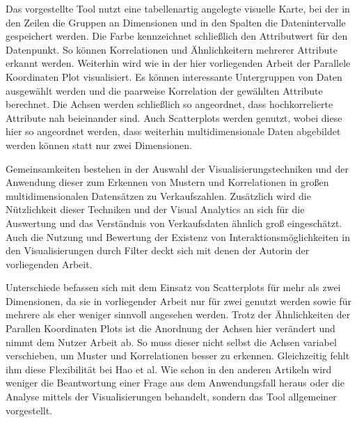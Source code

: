 \documentclass[usegeometry=true]{scrartcl}
\begin{document}
Das vorgestellte Tool nutzt eine tabellenartig angelegte visuelle Karte, bei der in den Zeilen die Gruppen an Dimensionen und in den Spalten die Datenintervalle gespeichert werden.
Die Farbe kennzeichnet schließlich den Attributwert für den Datenpunkt. So können Korrelationen und Ähnlichkeitern mehrerer Attribute erkannt werden.
Weiterhin wird wie in der hier vorliegenden Arbeit der Parallele Koordinaten Plot visualisiert. 
Es können interessante Untergruppen von Daten ausgewählt werden und die paarweise Korrelation der gewählten Attribute berechnet. 
Die Achsen werden schließlich so angeordnet, dass hochkorrelierte Attribute nah beieinander sind. 
Auch Scatterplots werden genutzt, wobei diese hier so angeordnet werden, dass weiterhin multidimensionale Daten abgebildet werden können statt nur zwei Dimensionen.

Gemeinsamkeiten bestehen in der Auswahl der Visualisierungstechniken und der Anwendung dieser zum Erkennen von Mustern und Korrelationen in großen multidimensionalen Datensätzen zu Verkaufszahlen.
Zusätzlich wird die Nützlichkeit dieser Techniken und der Visual Analytics an sich für die Auswertung und das Verständnis von Verkaufsdaten ähnlich groß eingeschätzt.
Auch die Nutzung und Bewertung der Existenz von Interaktionsmöglichkeiten in den Visualisierungen durch Filter deckt sich mit denen der Autorin der vorliegenden Arbeit.

Unterschiede befassen sich mit dem Einsatz von Scatterplots für mehr als zwei Dimensionen, da sie in vorliegender Arbeit nur für zwei genutzt werden sowie für mehrere als eher weniger sinnvoll angesehen werden.
Trotz der Ähnlichkeiten der Parallen Koordinaten Plots ist die Anordnung der Achsen hier verändert und nimmt dem Nutzer Arbeit ab. 
So muss dieser nicht selbst die Achsen variabel verschieben, um Muster und Korrelationen besser zu erkennen. Gleichzeitig fehlt ihm diese Flexibilität bei Hao et al.
Wie schon in den anderen Artikeln wird weniger die Beantwortung einer Frage aus dem Anwendungsfall heraus oder die Analyse mittels der Visualisierungen behandelt, sondern das Tool allgemeiner vorgestellt.

\end{document}

